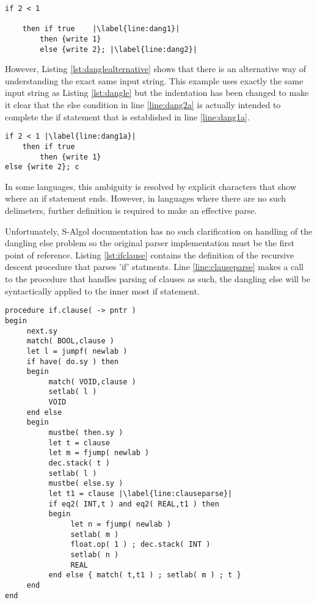 \documentclass{article}
\begin{document}
\begin{lstlisting}[caption={S-Algol dangling else},label={lst:dangle}, escapechar="|"]
if 2 < 1

	then if true	|\label{line:dang1}|
		then {write 1}
		else {write 2}; |\label{line:dang2}|
\end{lstlisting}

However, Listing \ref{lst:danglealternative} shows that there is an alternative way of understanding the exact same input string. This example uses exactly the same input string as Listing \ref{lst:dangle} but the indentation has been changed to make it clear that the else condition in line \ref{line:dang2a} is actually intended to complete the if statement that is established in line \ref{line:dang1a}.

\begin{lstlisting}[caption={S-Algol dangling else alternative parse},label={lst:danglealternative}, escapechar="|"]
if 2 < 1 |\label{line:dang1a}|
	then if true 
		then {write 1}
else {write 2}; c
\end{lstlisting}

In some languages, this ambiguity is resolved by explicit characters that show where an if statement ends. However, in languages where there are no such delimeters, further definition is required to make an effective parse.

Unfortunately, S-Algol documentation has no such clarification on handling of the dangling else problem so the original parser implementation must be the first point of reference. Listing \ref{lst:ifclause} contains the definition of the recursive descent procedure that parses 'if' statments. Line \ref{line:clauseparse} makes a call to the procedure that handles parsing of clauses as such, the dangling else will be syntactically applied to the inner most if statement.

\begin{lstlisting}[caption={S-Algol compiler implementation of parsing an 'if' statement},label={lst:ifclause}, escapechar="|"]
procedure if.clause( -> pntr )
begin
     next.sy
     match( BOOL,clause )
     let l = jumpf( newlab )
     if have( do.sy ) then
     begin
          match( VOID,clause )
          setlab( l )
          VOID
     end else
     begin
          mustbe( then.sy )
          let t = clause
          let m = fjump( newlab )
          dec.stack( t )
          setlab( l )
          mustbe( else.sy )
          let t1 = clause |\label{line:clauseparse}|
          if eq2( INT,t ) and eq2( REAL,t1 ) then
          begin
               let n = fjump( newlab )
               setlab( m )
               float.op( 1 ) ; dec.stack( INT )
               setlab( n )
               REAL
          end else { match( t,t1 ) ; setlab( m ) ; t }
     end
end
\end{lstlisting}
\end{document}
